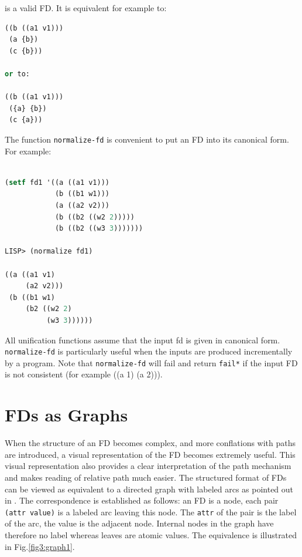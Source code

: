 \documentclass[10pt,a4paper]{report}
\begin{document}
is a valid FD. It is equivalent for example to:

\begin{lstlisting}[language=Lisp]
((b ((a1 v1)))
 (a {b})
 (c {b})) 

or to:

((b ((a1 v1)))
 ({a} {b})
 (c {a}))
\end{lstlisting}

The function {\tt normalize-fd}  is convenient
to put an FD into its canonical form.  For example:

\begin{lstlisting}[language=Lisp]

(setf fd1 '((a ((a1 v1)))
            (b ((b1 w1)))
            (a ((a2 v2)))
            (b ((b2 ((w2 2)))))
            (b ((b2 ((w3 3)))))))

LISP> (normalize fd1)

((a ((a1 v1)
     (a2 v2)))
 (b ((b1 w1)
     (b2 ((w2 2)
          (w3 3))))))

\end{lstlisting}

All unification functions assume that the input fd is given in canonical
form.  {\tt normalize-fd} is particularly useful when the inputs are produced
incrementally by a program.  Note that {\tt normalize-fd} will fail and
return {\tt *fail*} if the input FD is not consistent (for example ((a 1) (a
2))).  




\section{FDs as Graphs}
\label{graph}

When the structure of an FD becomes complex, and more conflations with
paths are introduced, a visual representation of the FD becomes extremely
useful.  This visual representation also provides a clear interpretation of
the path mechanism and makes reading of relative path much easier.  The
structured format of FDs can be viewed as equivalent to a directed graph
with labeled arcs as pointed out in \cite{Karttunen-84}.  The
correspondence is established as follows: an FD is a node, each pair
{\tt (attr value)} is a labeled arc leaving this node.  The {\tt attr} of the
pair is the label of the arc, the value is the adjacent node. Internal
nodes in the graph have therefore no label whereas leaves are atomic
values.  The equivalence is illustrated in Fig.\ref{fig3:graph1}.
\end{document}
